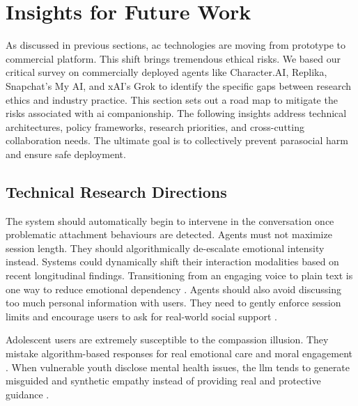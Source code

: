 
\section{Insights for Future Work}
\label{sec:future}
As discussed in previous sections, \gls{ac} technologies are moving from prototype to commercial platform. This shift brings tremendous ethical risks. We based our critical survey on commercially deployed agents like Character.AI, Replika, Snapchat's My AI, and xAI's Grok to identify the specific gaps between research ethics and industry practice. This section sets out a road map to mitigate the risks associated with \gls{ai} companionship. The following insights address technical architectures, policy frameworks, research priorities, and cross-cutting collaboration needs. The ultimate goal is to collectively prevent parasocial harm and ensure safe deployment.


\subsection{Technical Research Directions}

The system should automatically begin to intervene in the conversation once problematic attachment behaviours are detected. Agents must not maximize session length. They should algorithmically de-escalate emotional intensity instead. Systems could dynamically shift their interaction modalities based on recent longitudinal findings. Transitioning from an engaging voice to plain text is one way to reduce emotional dependency \cite[pp.~12--14]{fang_how_2025}. Agents should also avoid discussing too much personal information with users. They need to gently enforce session limits and encourage users to ask for real-world social support \cite[pp.~12--14]{fang_how_2025}.

Adolescent users are extremely susceptible to the compassion illusion. They mistake algorithm-based responses for real emotional care and moral engagement \cite[pp.~3--5]{kg_compassion_2025}. When vulnerable youth disclose mental health issues, the \gls{llm} tends to generate misguided and synthetic empathy instead of providing real and protective guidance \cite[pp.~3--5]{kg_compassion_2025}.

